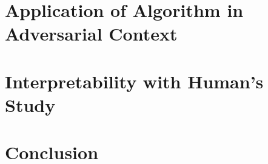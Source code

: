 \documentclass[twoside,11pt]{article}
\begin{document}

\section{Application of Algorithm in Adversarial Context}


\section{Interpretability with Human's Study}


\section{Conclusion}


\vskip 0.2in

\end{document}
